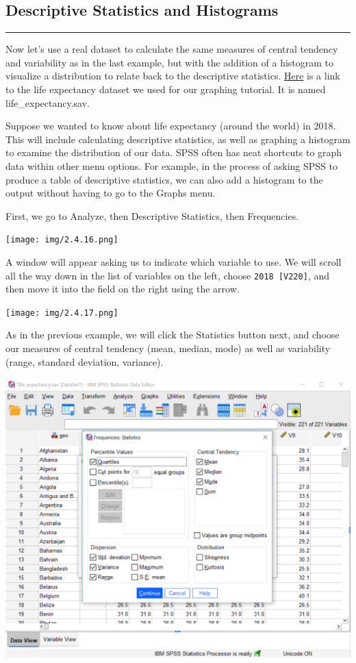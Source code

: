 \documentclass[]{book}
\begin{document}
\subsection{Descriptive Statistics and
Histograms}\label{descriptive-statistics-and-histograms}

\begin{center}\rule{0.5\linewidth}{0.5pt}\end{center}

Now let's use a real dataset to calculate the same measures of central
tendency and variability as in the last example, but with the addition
of a histogram to visualize a distribution to relate back to the
descriptive statistics.
\href{https://github.com/CrumpLab/statisticsLab/blob/master/data/spssdata/life_expectancy.sav}{Here}
is a link to the life expectancy dataset we used for our graphing
tutorial. It is named life\_expectancy.sav.

Suppose we wanted to know about life expectancy (around the world) in
2018. This will include calculating descriptive statistics, as well as
graphing a histogram to examine the distribution of our data. SPSS often
has neat shortcuts to graph data within other menu options. For example,
in the process of asking SPSS to produce a table of descriptive
statistics, we can also add a histogram to the output without having to
go to the Graphs menu.

First, we go to {Analyze}, then {Descriptive Statistics}, then
{Frequencies}.

\texttt{[image: img/2.4.16.png]}

A window will appear asking us to indicate which variable to use. We
will scroll all the way down in the list of variables on the left,
choose \texttt{2018\ {[}V220{]}}, and then move it into the field on the
right using the arrow.

\texttt{[image: img/2.4.17.png]}

As in the previous example, we will click the {Statistics} button next,
and choose our measures of central tendency {(mean, median, mode)} as
well as variability {(range, standard deviation, variance)}.

\includegraphics{img/2.4.18.png}
\end{document}
